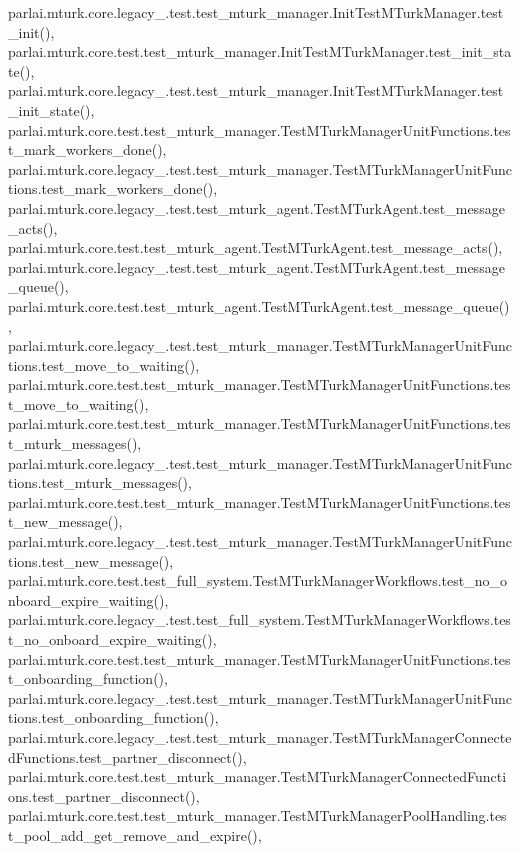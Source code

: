 parlai.\+mturk.\+core.\+legacy\+\_.\+test.\+test\+\_\+mturk\+\_\+manager.\+Init\+Test\+M\+Turk\+Manager.\+test\+\_\+init(), parlai.\+mturk.\+core.\+test.\+test\+\_\+mturk\+\_\+manager.\+Init\+Test\+M\+Turk\+Manager.\+test\+\_\+init\+\_\+state(), parlai.\+mturk.\+core.\+legacy\+\_.\+test.\+test\+\_\+mturk\+\_\+manager.\+Init\+Test\+M\+Turk\+Manager.\+test\+\_\+init\+\_\+state(), parlai.\+mturk.\+core.\+test.\+test\+\_\+mturk\+\_\+manager.\+Test\+M\+Turk\+Manager\+Unit\+Functions.\+test\+\_\+mark\+\_\+workers\+\_\+done(), parlai.\+mturk.\+core.\+legacy\+\_.\+test.\+test\+\_\+mturk\+\_\+manager.\+Test\+M\+Turk\+Manager\+Unit\+Functions.\+test\+\_\+mark\+\_\+workers\+\_\+done(), parlai.\+mturk.\+core.\+legacy\+\_.\+test.\+test\+\_\+mturk\+\_\+agent.\+Test\+M\+Turk\+Agent.\+test\+\_\+message\+\_\+acts(), parlai.\+mturk.\+core.\+test.\+test\+\_\+mturk\+\_\+agent.\+Test\+M\+Turk\+Agent.\+test\+\_\+message\+\_\+acts(), parlai.\+mturk.\+core.\+legacy\+\_.\+test.\+test\+\_\+mturk\+\_\+agent.\+Test\+M\+Turk\+Agent.\+test\+\_\+message\+\_\+queue(), parlai.\+mturk.\+core.\+test.\+test\+\_\+mturk\+\_\+agent.\+Test\+M\+Turk\+Agent.\+test\+\_\+message\+\_\+queue(), parlai.\+mturk.\+core.\+legacy\+\_.\+test.\+test\+\_\+mturk\+\_\+manager.\+Test\+M\+Turk\+Manager\+Unit\+Functions.\+test\+\_\+move\+\_\+to\+\_\+waiting(), parlai.\+mturk.\+core.\+test.\+test\+\_\+mturk\+\_\+manager.\+Test\+M\+Turk\+Manager\+Unit\+Functions.\+test\+\_\+move\+\_\+to\+\_\+waiting(), parlai.\+mturk.\+core.\+test.\+test\+\_\+mturk\+\_\+manager.\+Test\+M\+Turk\+Manager\+Unit\+Functions.\+test\+\_\+mturk\+\_\+messages(), parlai.\+mturk.\+core.\+legacy\+\_.\+test.\+test\+\_\+mturk\+\_\+manager.\+Test\+M\+Turk\+Manager\+Unit\+Functions.\+test\+\_\+mturk\+\_\+messages(), parlai.\+mturk.\+core.\+test.\+test\+\_\+mturk\+\_\+manager.\+Test\+M\+Turk\+Manager\+Unit\+Functions.\+test\+\_\+new\+\_\+message(), parlai.\+mturk.\+core.\+legacy\+\_.\+test.\+test\+\_\+mturk\+\_\+manager.\+Test\+M\+Turk\+Manager\+Unit\+Functions.\+test\+\_\+new\+\_\+message(), parlai.\+mturk.\+core.\+test.\+test\+\_\+full\+\_\+system.\+Test\+M\+Turk\+Manager\+Workflows.\+test\+\_\+no\+\_\+onboard\+\_\+expire\+\_\+waiting(), parlai.\+mturk.\+core.\+legacy\+\_.\+test.\+test\+\_\+full\+\_\+system.\+Test\+M\+Turk\+Manager\+Workflows.\+test\+\_\+no\+\_\+onboard\+\_\+expire\+\_\+waiting(), parlai.\+mturk.\+core.\+test.\+test\+\_\+mturk\+\_\+manager.\+Test\+M\+Turk\+Manager\+Unit\+Functions.\+test\+\_\+onboarding\+\_\+function(), parlai.\+mturk.\+core.\+legacy\+\_.\+test.\+test\+\_\+mturk\+\_\+manager.\+Test\+M\+Turk\+Manager\+Unit\+Functions.\+test\+\_\+onboarding\+\_\+function(), parlai.\+mturk.\+core.\+legacy\+\_.\+test.\+test\+\_\+mturk\+\_\+manager.\+Test\+M\+Turk\+Manager\+Connected\+Functions.\+test\+\_\+partner\+\_\+disconnect(), parlai.\+mturk.\+core.\+test.\+test\+\_\+mturk\+\_\+manager.\+Test\+M\+Turk\+Manager\+Connected\+Functions.\+test\+\_\+partner\+\_\+disconnect(), parlai.\+mturk.\+core.\+test.\+test\+\_\+mturk\+\_\+manager.\+Test\+M\+Turk\+Manager\+Pool\+Handling.\+test\+\_\+pool\+\_\+add\+\_\+get\+\_\+remove\+\_\+and\+\_\+expire(), 